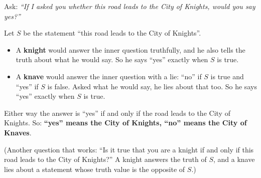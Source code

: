 Ask: \emph{``If I asked you whether this road leads to the City of Knights, would you say yes?''}

Let $S$ be the statement ``this road leads to the City of Knights''.
\begin{itemize}
\item A \textbf{knight} would answer the inner question truthfully, and he also tells the truth about what he would say. So he says ``yes'' exactly when $S$ is true.
\item A \textbf{knave} would answer the inner question with a lie: ``no'' if $S$ is true and ``yes'' if $S$ is false. Asked what he would say, he lies about that too. So he says ``yes'' exactly when $S$ is true.
\end{itemize}
Either way the answer is ``yes'' if and only if the road leads to the City of Knights. So: \textbf{``yes'' means the City of Knights, ``no'' means the City of Knaves}.

(Another question that works: ``Is it true that you are a knight if and only if this road leads to the City of Knights?'' A knight answers the truth of $S$, and a knave lies about a statement whose truth value is the opposite of $S$.)

